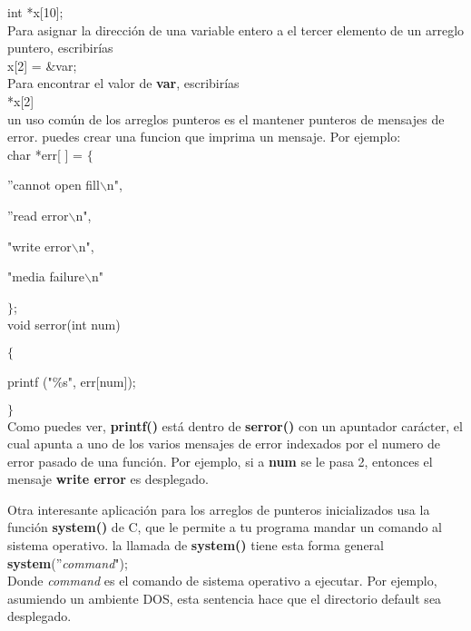 \documentclass[]{article}
\begin{document}
	int *x[10];\\
	
	Para asignar la dirección de una variable entero a el tercer elemento de un arreglo puntero, escribirías\\
	
	x[2] = \&var;\\
	
	Para encontrar el valor de \textbf{var}, escribirías\\
	
	*x[2]\\
	
	un uso común de los arreglos punteros es el mantener punteros de mensajes de error. puedes crear una funcion que imprima un mensaje. Por ejemplo:\\
	
	char *err[ ] = $\lbrace$
	
	''cannot open fill$\backslash$n",
	
	''read error$\backslash$n",
	
	"write error$\backslash$n",
	
	"media failure$\backslash$n"
	
	$\rbrace$;\\
	
	void serror(int num)
	
	$\lbrace$
	
	printf ("\%s", err[num]);
	
	$\rbrace$\\
	
	Como puedes ver, \textbf{printf()} está dentro de \textbf{serror()} con un apuntador carácter, el cual apunta a uno de los varios mensajes de error indexados por el numero de error pasado de una función. Por ejemplo, si a \textbf{num} se le pasa 2, entonces el mensaje \textbf{write error} es desplegado.
	
	Otra interesante aplicación para los arreglos de punteros inicializados usa la función \textbf{system()} de C, que le permite a tu programa mandar un comando al sistema operativo. la llamada de \textbf{system()} tiene esta forma general\\
	
	\textbf{system}(''\textit{command}");\\
	
	Donde \textit{command} es el comando de sistema operativo a ejecutar. Por ejemplo, asumiendo un ambiente DOS, esta sentencia hace que el directorio default sea desplegado.\\
	
\end{document}
